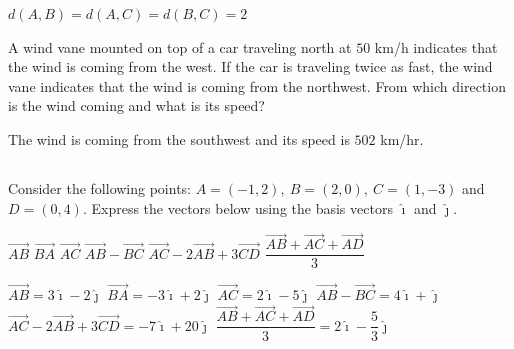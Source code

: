 \begin{Answer}\phantom{}
    $d(A,B) = d(A,C) = d(B,C) = 2$
\end{Answer}
\fi

\ifanalysis
\begin{Exercise}[difficulty=2] A wind vane mounted on top of a car traveling north at $50$ km/h indicates that the wind is coming from the west. If the car is traveling twice as fast, the wind vane indicates that the wind is coming from the northwest. From which direction is the wind coming and what is its speed? 

\end{Exercise}

\begin{Answer}\phantom{}
    The wind is coming from the southwest and its speed is $50{2}$ km/hr.
\end{Answer}
\fi


\subsection*{}
\begin{Exercise} Consider the following points: $A=(-1,2),\ B=(2,0),\ C=(1,-3)$ and $D=(0,4)$. Express the vectors below using the basis vectors $\hat{\imath}$ and $\hat{\jmath}$. 
	\begin{multicols}{3}
		\Question[difficulty = 1] $\overrightarrow{AB}$
		\Question[difficulty = 1] $\overrightarrow{BA}$
		\Question[difficulty = 1] $\overrightarrow{AC}$
		\Question[difficulty = 1] $\overrightarrow{AB} - \overrightarrow{BC} $
		\Question[difficulty = 1] $\overrightarrow{AC} - 2 \overrightarrow{AB} + 3 \overrightarrow{CD} $
		\Question[difficulty = 1] $\dfrac{\overrightarrow{AB} + \overrightarrow{AC} + \overrightarrow{AD}}{3}$
        \EndCurrentQuestion
	\end{multicols}
\end{Exercise}

\begin{Answer}\phantom{}
    \begin{multicols}{2}
	
		\Question $\overrightarrow{AB} = 3\hat{\imath} - 2 \hat{\jmath}$
		\Question $\overrightarrow{BA} = -3\hat{\imath} + 2 \hat{\jmath}$
		\Question $\overrightarrow{AC} = 2\hat{\imath} - 5 \hat{\jmath}$
		\Question $\overrightarrow{AB} - \overrightarrow{BC} = 4 \hat{\imath} +\hat{\jmath} $
		\Question $\overrightarrow{AC} - 2 \overrightarrow{AB} + 3 \overrightarrow{CD} = -7 \hat{\imath} + 20\hat{\jmath}$
		\Question $\dfrac{\overrightarrow{AB} + \overrightarrow{AC} + \overrightarrow{AD}}{3} = 2 \hat{\imath} - \dfrac{5}{3}\hat{\jmath}$
	\EndCurrentQuestion
	\end{multicols}
\end{Answer}



